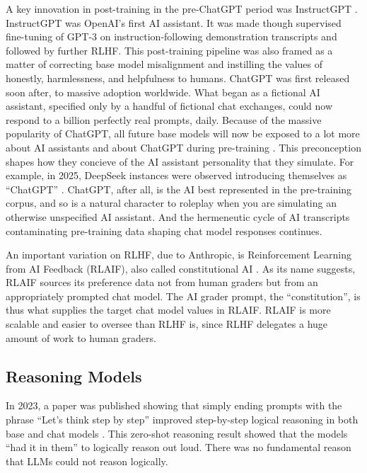 A key innovation in post-training in the pre-ChatGPT period was InstructGPT
\cite{ouyang2022feedback}. InstructGPT was OpenAI's first AI assistant. It was
made though supervised fine-tuning of GPT-3 on instruction-following
demonstration transcripts and followed by further RLHF. This post-training
pipeline was also framed as a matter of correcting base model misalignment and
instilling the values of honestly, harmlessness, and helpfulness to humans.
ChatGPT was first released soon after, to massive adoption worldwide. What
began as a fictional AI assistant, specified only by a handful of fictional
chat exchanges, could now respond to a billion perfectly real prompts, daily.
Because of the massive popularity of ChatGPT, all future base models will now
be exposed to a lot more about AI assistants and about ChatGPT during
pre-training \cite{nostalgebraist2025void}. This preconception shapes how they
concieve of the AI assistant personality that they simulate. For example, in
2025, DeepSeek instances \cite{deepseekai2025deepseek} were observed
introducing themselves as ``ChatGPT'' \cite{}. ChatGPT, after all, is the AI
best represented in the pre-training corpus, and so is a natural character to
roleplay when you are simulating an otherwise unspecified AI assistant. And the
hermeneutic cycle of AI transcripts contaminating pre-training data shaping
chat model responses continues.

An important variation on RLHF, due to Anthropic, is Reinforcement Learning
from AI Feedback (RLAIF), also called constitutional AI
\cite{bai2022constitutional}. As its name suggests, RLAIF sources its
preference data not from human graders but from an appropriately prompted chat
model. The AI grader prompt, the ``constitution'', is thus what supplies the
target chat model values in RLAIF. RLAIF is more scalable and easier to oversee
than RLHF is, since RLHF delegates a huge amount of work to human graders.

\subsection{Reasoning Models}
In 2023, a paper was published showing that simply ending prompts with the
phrase ``Let's think step by step'' improved step-by-step logical reasoning in
both base and chat models \cite{kojima2023zeroshot}. This zero-shot reasoning
result showed that the models ``had it in them'' to logically reason out loud.
There was no fundamental reason that LLMs could not reason logically.

